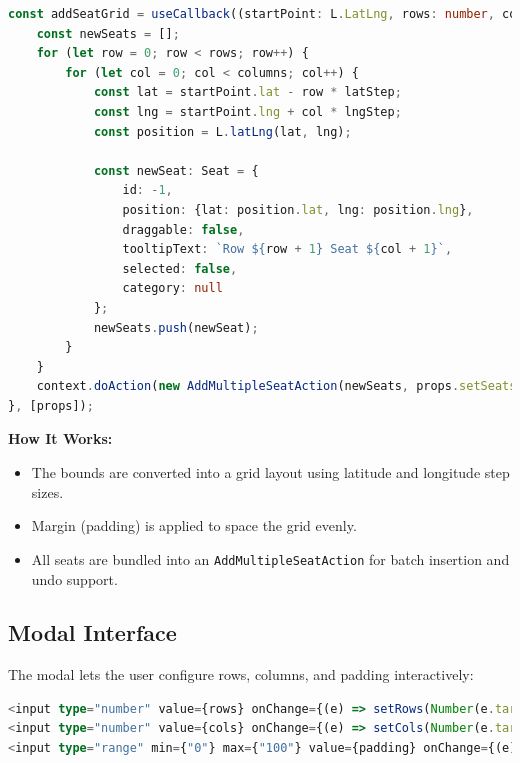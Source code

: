 \begin{lstlisting}[language=TypeScript, caption=Add Grid Logic, label=lst:grid-add-seat-logic]
const addSeatGrid = useCallback((startPoint: L.LatLng, rows: number, columns: number, latStep: number, lngStep: number) => {
    const newSeats = [];
    for (let row = 0; row < rows; row++) {
        for (let col = 0; col < columns; col++) {
            const lat = startPoint.lat - row * latStep;
            const lng = startPoint.lng + col * lngStep;
            const position = L.latLng(lat, lng);

            const newSeat: Seat = {
                id: -1,
                position: {lat: position.lat, lng: position.lng},
                draggable: false,
                tooltipText: `Row ${row + 1} Seat ${col + 1}`,
                selected: false,
                category: null
            };
            newSeats.push(newSeat);
        }
    }
    context.doAction(new AddMultipleSeatAction(newSeats, props.setSeats))
}, [props]);
\end{lstlisting}

\textbf{How It Works:}
\begin{itemize}
    \item The bounds are converted into a grid layout using latitude and longitude step sizes.
    \item Margin (padding) is applied to space the grid evenly.
    \item All seats are bundled into an \texttt{AddMultipleSeatAction} for batch insertion and undo support.
\end{itemize}

\subsection{Modal Interface}
The modal lets the user configure rows, columns, and padding interactively:

\begin{lstlisting}[language=TypeScript, caption=Modal Input Fields, label=lst:grid-modal-ui]
<input type="number" value={rows} onChange={(e) => setRows(Number(e.target.value))} />
<input type="number" value={cols} onChange={(e) => setCols(Number(e.target.value))} />
<input type="range" min={"0"} max={"100"} value={padding} onChange={(e) => setPadding(Number(e.target.value))} />
\end{lstlisting}

